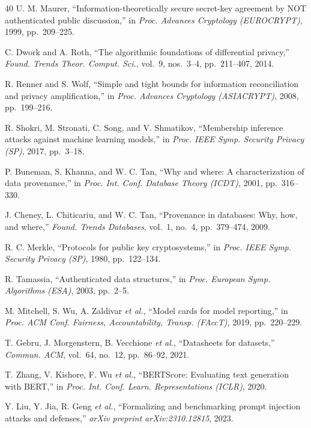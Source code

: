 \documentclass[journal,10pt]{IEEEtran}
\begin{document}
\begin{thebibliography}{40}
 U. M. Maurer, ``Information-theoretically secure secret-key agreement by NOT authenticated public discussion,'' in \emph{Proc. Advances Cryptology (EUROCRYPT)}, 1999, pp.\ 209--225.

 C. Dwork and A. Roth, ``The algorithmic foundations of differential privacy,'' \emph{Found. Trends Theor. Comput. Sci.}, vol.~9, nos.~3--4, pp.\ 211--407, 2014.

 R. Renner and S. Wolf, ``Simple and tight bounds for information reconciliation and privacy amplification,'' in \emph{Proc. Advances Cryptology (ASIACRYPT)}, 2008, pp.\ 199--216.

 R. Shokri, M. Stronati, C. Song, and V. Shmatikov, ``Membership inference attacks against machine learning models,'' in \emph{Proc. IEEE Symp. Security Privacy (SP)}, 2017, pp.\ 3--18.

 P. Buneman, S. Khanna, and W. C. Tan, ``Why and where: A characterization of data provenance,'' in \emph{Proc. Int. Conf. Database Theory (ICDT)}, 2001, pp.\ 316--330.

 J. Cheney, L. Chiticariu, and W. C. Tan, ``Provenance in databases: Why, how, and where,'' \emph{Found. Trends Databases}, vol.~1, no.~4, pp.\ 379--474, 2009.

 R. C. Merkle, ``Protocols for public key cryptosystems,'' in \emph{Proc. IEEE Symp. Security Privacy (SP)}, 1980, pp.\ 122--134.

 R. Tamassia, ``Authenticated data structures,'' in \emph{Proc. European Symp. Algorithms (ESA)}, 2003, pp.\ 2--5.

 M. Mitchell, S. Wu, A. Zaldivar \emph{et al.}, ``Model cards for model reporting,'' in \emph{Proc. ACM Conf. Fairness, Accountability, Transp. (FAccT)}, 2019, pp.\ 220--229.

 T. Gebru, J. Morgenstern, B. Vecchione \emph{et al.}, ``Datasheets for datasets,'' \emph{Commun. ACM}, vol.~64, no.~12, pp.\ 86--92, 2021.

 T. Zhang, V. Kishore, F. Wu \emph{et al.}, ``BERTScore: Evaluating text generation with BERT,'' in \emph{Proc. Int. Conf. Learn. Representations (ICLR)}, 2020.

 Y. Liu, Y. Jia, R. Geng \emph{et al.}, ``Formalizing and benchmarking prompt injection attacks and defenses,'' \emph{arXiv preprint arXiv:2310.12815}, 2023.


\end{thebibliography}
\end{document}
